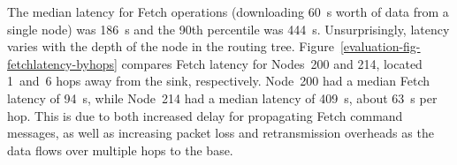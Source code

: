 The median latency for Fetch operations (downloading 60~s worth of data from
a single node) was 186~s and the 90th percentile was 444~s. Unsurprisingly,
latency varies with the depth of the node in the routing tree.
Figure~\ref{evaluation-fig-fetchlatency-byhops} compares Fetch latency for
Nodes~200 and 214, located 1~and~6 hops away from the sink, respectively.
Node~200 had a median Fetch latency of 94~s, while Node~214 had a median
latency of 409~s, about 63~s per hop. This is due to both increased delay for
propagating Fetch command messages, as well as increasing packet loss and
retransmission overheads as the data flows over multiple hops to the base.
